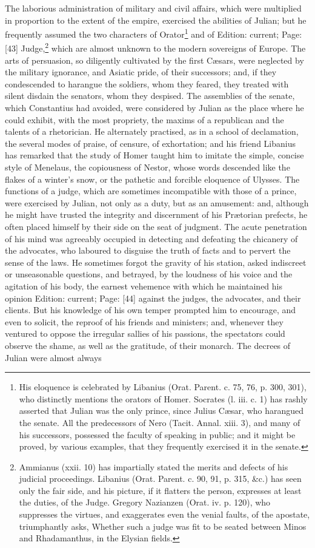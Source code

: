 The laborious administration of military and civil affairs, which were multiplied in proportion to the extent of the empire, exercised the abilities of Julian; but he frequently assumed the two characters of Orator\footnote{His eloquence is celebrated by Libanius (Orat. Parent. c. 75, 76, p. 300, 301), who distinctly mentions the orators of Homer. Socrates (l. iii. c. 1) has rashly asserted that Julian was the only prince, since Julius Cæsar, who harangued the senate. All the predecessors of Nero (Tacit. Annal. xiii. 3), and many of his successors, possessed the faculty of speaking in public; and it might be proved, by various examples, that they frequently exercised it in the senate.} and of Edition: current; Page: [43] Judge,\footnote{Ammianus (xxii. 10) has impartially stated the merits and defects of his judicial proceedings. Libanius (Orat. Parent. c. 90, 91, p. 315, \&c.) has seen only the fair side, and his picture, if it flatters the person, expresses at least the duties, of the Judge. Gregory Nazianzen (Orat. iv. p. 120), who suppresses the virtues, and exaggerates even the venial faults, of the apostate, triumphantly asks, Whether such a judge was fit to be seated between Minos and Rhadamanthus, in the Elysian fields.} which are almost unknown to the modern sovereigns of Europe. The arts of persuasion, so diligently cultivated by the first Cæsars, were neglected by the military ignorance, and Asiatic pride, of their successors; and, if they condescended to harangue the soldiers, whom they feared, they treated with silent disdain the senators, whom they despised. The assemblies of the senate, which Constantius had avoided, were considered by Julian as the place where he could exhibit, with the most propriety, the maxims of a republican and the talents of a rhetorician. He alternately practised, as in a school of declamation, the several modes of praise, of censure, of exhortation; and his friend Libanius has remarked that the study of Homer taught him to imitate the simple, concise style of Menelaus, the copiousness of Nestor, whose words descended like the flakes of a winter\texthebrew{}’s snow, or the pathetic and forcible eloquence of Ulysses. The functions of a judge, which are sometimes incompatible with those of a prince, were exercised by Julian, not only as a duty, but as an amusement: and, although he might have trusted the integrity and discernment of his Prætorian prefects, he often placed himself by their side on the seat of judgment. The acute penetration of his mind was agreeably occupied in detecting and defeating the chicanery of the advocates, who laboured to disguise the truth of facts and to pervert the sense of the laws. He sometimes forgot the gravity of his station, asked indiscreet or unseasonable questions, and betrayed, by the loudness of his voice and the agitation of his body, the earnest vehemence with which he maintained his opinion Edition: current; Page: [44] against the judges, the advocates, and their clients. But his knowledge of his own temper prompted him to encourage, and even to solicit, the reproof of his friends and ministers; and, whenever they ventured to oppose the irregular sallies of his passions, the spectators could observe the shame, as well as the gratitude, of their monarch. The decrees of Julian were almost always 